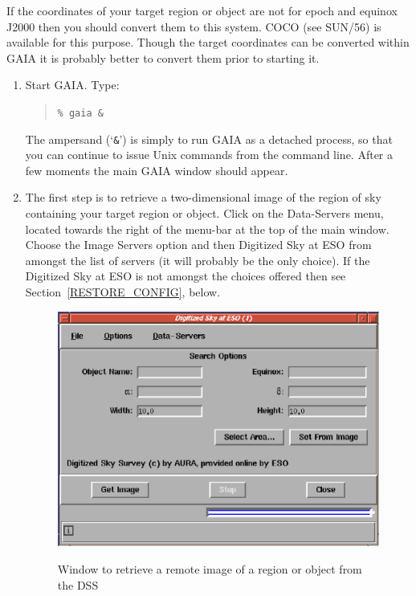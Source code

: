 \documentclass[twoside,11pt]{article}
\renewcommand{\_}{\texttt{\symbol{95}}}
\begin{document}
If the coordinates of your target region or object are not for epoch and
equinox J2000 then you should convert them to this system.  COCO (see
SUN/56\cite{SUN56}) is available for this purpose.  Though the target
coordinates can be converted within GAIA it is probably better to convert
them prior to starting it.

\begin{enumerate}

  \item Start GAIA.  Type:

  \begin{quote}
   {\tt \%  gaia \&}
  \end{quote}

   The ampersand (`{\tt \&}') is simply to run GAIA as a detached process,
   so that you can continue to issue Unix commands from the command line.
   After a few moments the main GAIA window should appear.

  \item The first step is to retrieve a two-dimensional image of the
   region of sky containing your target region or object.  Click on the
   {\sf Data-Servers} menu, located towards the right of the menu-bar at
   the top of the main window.  Choose the {\sf Image Servers} option and
   then {\sf Digitized Sky at ESO} from amongst the list of servers (it
   will probably be the only choice).  If the {\sf Digitized Sky at ESO}
   is not amongst the choices offered then see
   Section~\ref{RESTORE_CONFIG}, below.

  \begin{figure}[htbp]
     \centering
     \includegraphics[totalheight=3in]{sc17_retriev_r_dss.ps}
     \begin{quote}
     \caption[Window to retrieve a remote image]
      {Window to retrieve a remote image of a region or object from the
      DSS
     \label{RETRIEV_R_DSS} }
     \end{quote}
  \end{figure}


\end{enumerate}
\end{document}
